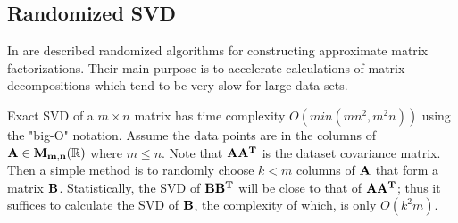 \subsection{Randomized SVD}
In \cite{Holmes, Halko2011, Candes2009} are described randomized algorithms for constructing approximate matrix factorizations. Their main purpose is to accelerate calculations of matrix decompositions which tend to be very slow for large data sets.

Exact SVD of a $m \times n$ matrix has time complexity $O(min(mn^2, m^2n))$ using the "big-O" notation. Assume the data points are in the columns of $\mathbf{A} \in \mathbf{M_{m,n}}(\mathbb{R})$ where $m \leq n$. Note that $\mathbf{AA^T}$ is the dataset covariance matrix. Then a simple method is to randomly choose $k<m$ columns of $\mathbf{A}$ that form a matrix $\mathbf{B}$. Statistically, the SVD of $\mathbf{BB^T}$ will be close to that of $\mathbf{AA^T}$; thus it suffices to calculate the SVD of $\mathbf{B}$, the complexity of which, is only $O(k^2m)$.




